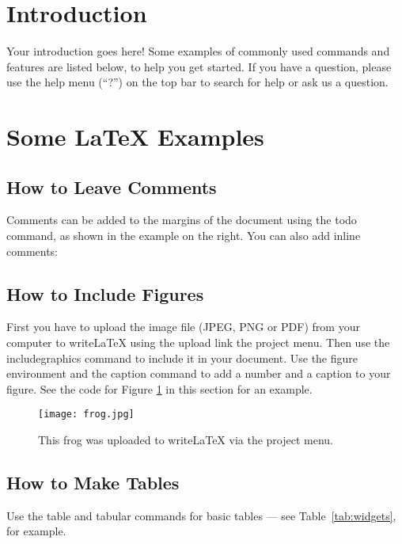 \documentclass[a4paper]{article}
\begin{document}
\section{Introduction}

Your introduction goes here! Some examples of commonly used commands and features are listed below, to help you get started. If you have a question, please use the help menu (``?'') on the top bar to search for help or ask us a question.

\section{Some \LaTeX{} Examples}
\label{sec:examples}

\subsection{How to Leave Comments}

Comments can be added to the margins of the document using the  todo command, as shown in the example on the right. You can also add inline comments:


\subsection{How to Include Figures}

First you have to upload the image file (JPEG, PNG or PDF) from your computer to writeLaTeX using the upload link the project menu. Then use the includegraphics command to include it in your document. Use the figure environment and the caption command to add a number and a caption to your figure. See the code for Figure \ref{fig:frog} in this section for an example.

\begin{figure}
\centering
\texttt{[image: frog.jpg]}
\caption{\label{fig:frog}This frog was uploaded to writeLaTeX via the project menu.}
\end{figure}

\subsection{How to Make Tables}

Use the table and tabular commands for basic tables --- see Table~\ref{tab:widgets}, for example.
\end{document}
